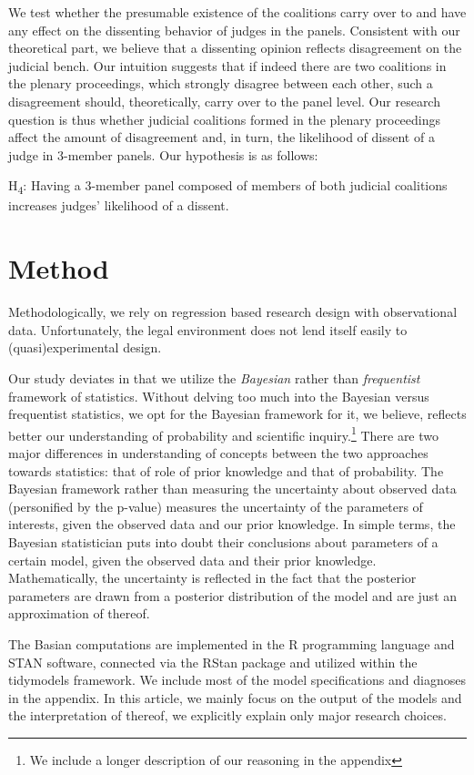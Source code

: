 \documentclass[
  11pt,
]{article}
\begin{document}
We test whether the presumable existence of the coalitions carry over to
and have any effect on the dissenting behavior of judges in the panels.
Consistent with our theoretical part, we believe that a dissenting
opinion reflects disagreement on the judicial bench. Our intuition
suggests that if indeed there are two coalitions in the plenary
proceedings, which strongly disagree between each other, such a
disagreement should, theoretically, carry over to the panel level. Our
research question is thus whether judicial coalitions formed in the
plenary proceedings affect the amount of disagreement and, in turn, the
likelihood of dissent of a judge in 3-member panels. Our hypothesis is
as follows:

H\textsubscript{4}: Having a 3-member panel composed of members of both
judicial coalitions increases judges' likelihood of a dissent.

\hypertarget{method}{%
\section{Method}\label{method}}

Methodologically, we rely on regression based research design with
observational data. Unfortunately, the legal environment does not lend
itself easily to (quasi)experimental design.

Our study deviates in that we utilize the \emph{Bayesian} rather than
\emph{frequentist} framework of statistics. Without delving too much
into the Bayesian versus frequentist statistics, we opt for the Bayesian
framework for it, we believe, reflects better our understanding of
probability and scientific inquiry.\footnote{We include a longer
  description of our reasoning in the appendix} There are two major
differences in understanding of concepts between the two approaches
towards statistics: that of role of prior knowledge and that of
probability. The Bayesian framework rather than measuring the
uncertainty about observed data (personified by the p-value) measures
the uncertainty of the parameters of interests, given the observed data
and our prior knowledge. In simple terms, the Bayesian statistician puts
into doubt their conclusions about parameters of a certain model, given
the observed data and their prior knowledge. Mathematically, the
uncertainty is reflected in the fact that the posterior parameters are
drawn from a posterior distribution of the model and are just an
approximation of thereof.

The Basian computations are implemented in the R programming language
and STAN software, connected via the RStan package and utilized within
the tidymodels framework. We include most of the model specifications
and diagnoses in the appendix. In this article, we mainly focus on the
output of the models and the interpretation of thereof, we explicitly
explain only major research choices.
\end{document}
